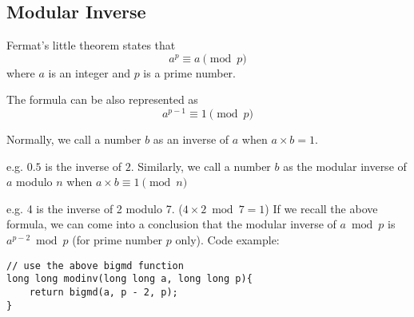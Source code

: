 \subsection{Modular Inverse}
Fermat's little theorem states that
$$a^p \equiv a \pmod{p}$$
where $a$ is an integer and $p$ is a prime number.

The formula can be also represented as
$$a^{p - 1} \equiv 1 \pmod{p}$$

Normally, we call a number $b$ as an inverse of $a$ when $a \times b = 1$.

e.g. $0.5$ is the inverse of $2$.
\linebreak
\linebreak
Similarly, we call a number $b$ as the modular inverse of $a$ modulo $n$ when $a \times b \equiv 1 \pmod{n}$

e.g. 4 is the inverse of 2 modulo 7. ($4 \times 2 \bmod{7} = 1$)
\linebreak
\linebreak
If we recall the above formula, we can come into a conclusion that
the modular inverse of $a \bmod{p}$ is $a^{p - 2} \bmod{p}$ (for prime number $p$ only).
\linebreak
\linebreak
Code example:
\begin{verbatim}
// use the above bigmd function
long long modinv(long long a, long long p){
    return bigmd(a, p - 2, p);
}
\end{verbatim}